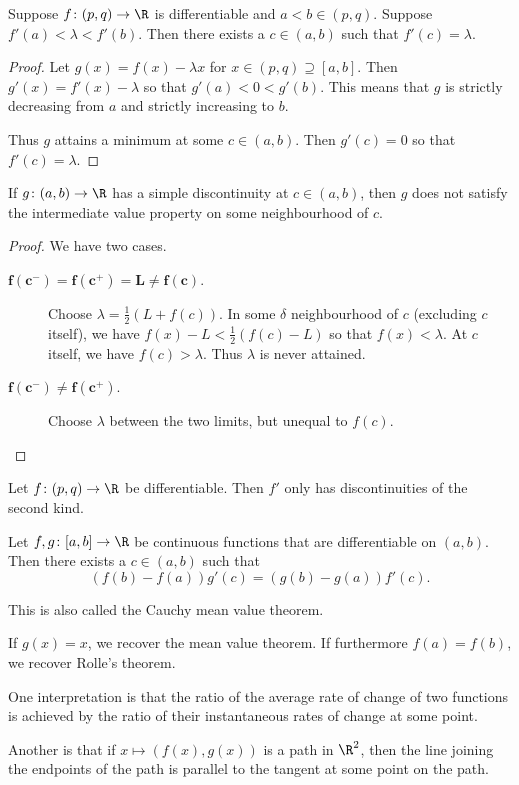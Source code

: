 \begin{theorem} \label{thm:diff:ivt}
    Suppose $f\colon (p, q) \to \R$ is differentiable and
    $a < b \in (p, q)$.
    Suppose $f'(a) < \lambda < f'(b)$.
    Then there exists a $c \in (a, b)$ such that $f'(c) = \lambda$.
\end{theorem}
\begin{proof}
    Let $g(x) = f(x) - \lambda x$ for $x \in (p, q) \supseteq [a, b]$.
    Then $g'(x) = f'(x) - \lambda$ so that $g'(a) < 0 < g'(b)$.
    This means that $g$ is strictly decreasing from $a$
    and strictly increasing to $b$.

    Thus $g$ attains a minimum at some $c \in (a, b)$.
    Then $g'(c) = 0$ so that $f'(c) = \lambda$.
\end{proof}

\begin{exercise}
    If $g\colon (a, b) \to \R$ has a simple discontinuity at $c \in (a, b)$,
    then $g$ does not satisfy the intermediate value property on some
    neighbourhood of $c$.
\end{exercise}
\begin{proof}
    We have two cases.
    \begin{description}
        \item[$\bm{f(c^-) = f(c^+) = L \ne f(c)}$.]
        Choose $\lambda = \frac12 (L + f(c))$.
        In some $\delta$ neighbourhood of $c$ (excluding $c$ itself),
        we have $f(x) - L < \frac12 (f(c) - L)$ so that
        $f(x) < \lambda$.
        At $c$ itself, we have $f(c) > \lambda$.
        Thus $\lambda$ is never attained.
        \item[$\bm{f(c^-) \ne f(c^+)}$.]
        Choose $\lambda$ between the two limits, but unequal to $f(c)$.
        \qedhere
    \end{description}
\end{proof}

\begin{corollary}
    Let $f\colon (p, q) \to \R$ be differentiable.
    Then $f'$ only has discontinuities of the second kind.
\end{corollary}

\begin{theorem*} \label{thm:mvt:general}
    Let $f, g\colon [a, b] \to \R$ be continuous functions that are
    differentiable on $(a, b)$.
    Then there exists a $c \in (a, b)$ such that \[
        (f(b) - f(a)) g'(c) = (g(b) - g(a)) f'(c).
    \]
\end{theorem*}
\begin{remark}
    This is also called the Cauchy mean value theorem.

    If $g(x) = x$, we recover the mean value theorem.
    If furthermore $f(a) = f(b)$, we recover Rolle's theorem.

    One interpretation is that the ratio of the average rate of change of
    two functions is achieved by the ratio of their instantaneous rates of
    change at some point.

    Another is that if $x \mapsto (f(x), g(x))$ is a path in $\R^2$, then
    the line joining the endpoints of the path is parallel to the tangent
    at some point on the path.
\end{remark}
